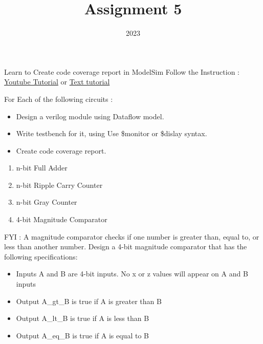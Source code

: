 \documentclass{vhdl-assignment}
\title{Assignment 5}
\date{2023}
\begin{document}
\maketitle
\thispagestyle{fancy}

\begin{problem}{Learn to Create code coverage report in ModelSim}
    Follow the Instruction : \href{https://youtu.be/vkzd5ckQ5ZQ}{Youtube Tutorial}
    or
    \href{https://github.com/canh25xp/VHDL_Weekly_Assignment/wiki/Code-Coverage-Report-Tutorial}{Text tutorial}

\end{problem}

\begin{problem}{}
    For Each of the following circuits :
    \begin{itemize}
        \item Design a verilog module using Dataflow model.
        \item Write testbench for it, using Use \$monitor or \$dislay syntax.
        \item Create code coverage report.
    \end{itemize}

    \begin{enumerate}
        \item n-bit Full Adder
        \item n-bit Ripple Carry Counter
        \item n-bit Gray Counter
        \item 4-bit Magnitude Comparator
    \end{enumerate}

FYI : A magnitude comparator checks if one number is greater than, equal to, or less than
another number. Design a 4-bit magnitude comparator that has the following
specifications:

\begin{itemize}
    \item Inputs A and B are 4-bit inputs. No x or z values will appear on A and B inputs
    \item Output A\_gt\_B is true if A is greater than B
    \item Output A\_lt\_B is true if A is less than B
    \item Output A\_eq\_B is true if A is equal to B
\end{itemize}

\end{problem}
\end{document}
